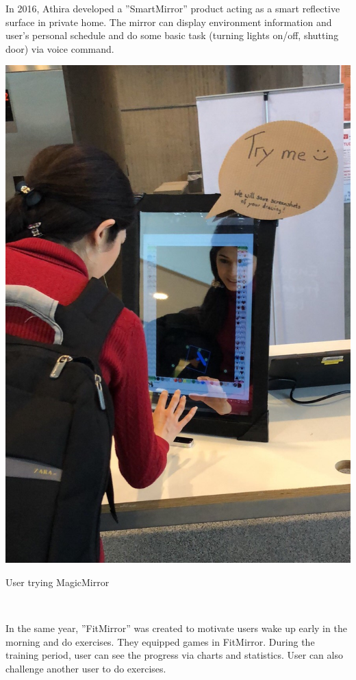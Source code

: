 \documentclass{sigchi-ext}
\begin{document}
In 2016, Athira \cite{athiraSmartMirrorNovel2016} developed a ''SmartMirror'' product acting as a smart reflective surface in private home. The mirror can display environment information and user's personal schedule and do some basic task (turning lights on/off, shutting door) via voice command.
\begin{marginfigure}[-35pc]
  \begin{minipage}{\marginparwidth}
    \centering
    \includegraphics[width=0.9\marginparwidth]{images/prototype.jpg}
    \caption{User trying MagicMirror}~\label{fig:user_mirror}
  \end{minipage}
\end{marginfigure}

In the same year, ''FitMirror'' \cite{bessererFitmirrorSmartMirror2016} was created  to motivate users wake up early in the morning and do exercises. They equipped games in FitMirror.  During the training period, user can see the progress via charts and statistics. User can also challenge another user to do exercises.
\end{document}
